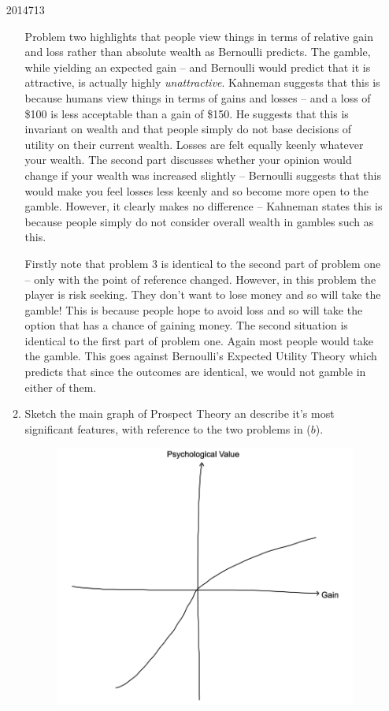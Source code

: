 \documentclass[10pt,\jkfside,a4paper]{article}
\begin{document}
\begin{enumerate}
\begin{examquestion}{2014}{7}{13}
\begin{enumerate}[label=(\alph*)]
Problem two highlights that people view things in terms of relative gain and loss rather
than absolute wealth as Bernoulli predicts. The gamble, while yielding an expected gain -- and
Bernoulli would predict that it is attractive, is actually highly
\textit{unattractive}.
Kahneman suggests that this is because humans view things in terms of gains and losses
-- and a loss of \$100 is less acceptable than a gain of \$150. He suggests that this is
invariant on wealth and that people simply do not base decisions of utility on their current wealth.
Losses are felt equally keenly whatever your wealth. The second part discusses whether
your opinion would change if your wealth was increased slightly -- Bernoulli suggests that this
would make you feel losses less keenly and so become more open to the gamble.
However, it clearly makes no difference -- Kahneman states this is because people
simply do not consider overall wealth in gambles such as this.

Firstly note that problem 3 is identical to the second part of problem one -- only with the point of
reference changed. However, in this problem the player is risk seeking. They don't want
to lose money and so will take the gamble! This is because people hope to avoid loss
and so will take the option that has a chance of gaining money. The second situation is
identical to the first part of problem one. Again most people would take the gamble.
This goes against Bernoulli's Expected Utility Theory which predicts that since the
outcomes are identical, we would not gamble in either of them.

\item Sketch the main graph of Prospect Theory an describe it's most significant 
features, with reference to the two problems in ($b$).

\begin{figure}[H]
\centering
\includegraphics[width=0.6\linewidth]{prospecttheory}
\end{figure}


\end{enumerate}
\end{examquestion}
\end{enumerate}
\end{document}
